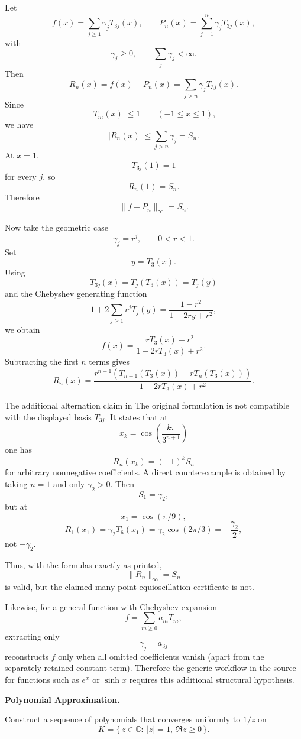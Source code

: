 \begin{solution}
Let
\[
f(x)=\sum_{j\ge1}\gamma_jT_{3j}(x),
\qquad
P_n(x)=\sum_{j=1}^{n}\gamma_jT_{3j}(x),
\]
with
\[
\gamma_j\ge0,
\qquad
\sum_j\gamma_j<\infty.
\]
Then
\[
R_n(x)
=
f(x)-P_n(x)
=
\sum_{j>n}\gamma_jT_{3j}(x).
\]
Since
\[
|T_m(x)|\le1
\qquad(-1\le x\le1),
\]
we have
\[
|R_n(x)|
\le
\sum_{j>n}\gamma_j
=
S_n.
\]
At \(x=1\),
\[
T_{3j}(1)=1
\]
for every \(j\), so
\[
R_n(1)=S_n.
\]
Therefore
\[
\boxed{
\|f-P_n\|_\infty=S_n.
}
\]

Now take the geometric case
\[
\gamma_j=r^j,
\qquad
0<r<1.
\]
Set
\[
y=T_3(x).
\]
Using
\[
T_{3j}(x)=T_j(T_3(x))=T_j(y)
\]
and the Chebyshev generating function
\[
1+2\sum_{j\ge1}r^jT_j(y)
=
\frac{1-r^2}{1-2ry+r^2},
\]
we obtain
\[
\boxed{
f(x)
=
\frac{rT_3(x)-r^2}
{1-2rT_3(x)+r^2}.
}
\]
Subtracting the first \(n\) terms gives
\[
\boxed{
R_n(x)
=
\frac{
r^{n+1}
\left(
T_{n+1}(T_3(x))
-
rT_n(T_3(x))
\right)
}{
1-2rT_3(x)+r^2
}.
}
\]

The additional alternation claim in The original formulation is not compatible with the displayed
basis \(T_{3j}\). It states that at
\[
x_k
=
\cos\left(\frac{k\pi}{3^{n+1}}\right)
\]
one has
\[
R_n(x_k)=(-1)^kS_n
\]
for arbitrary nonnegative coefficients. A direct counterexample is obtained by taking
\(n=1\) and only \(\gamma_2>0\). Then
\[
S_1=\gamma_2,
\]
but at
\[
x_1=\cos(\pi/9),
\]
\[
R_1(x_1)
=
\gamma_2T_6(x_1)
=
\gamma_2\cos(2\pi/3)
=
-\frac{\gamma_2}{2},
\]
not \(-\gamma_2\).

Thus, with the formulas exactly as printed,
\[
\boxed{
\|R_n\|_\infty=S_n
}
\]
is valid, but the claimed many-point equioscillation certificate is not.

Likewise, for a general function with Chebyshev expansion
\[
f=\sum_{m\ge0}a_mT_m,
\]
extracting only
\[
\gamma_j=a_{3j}
\]
reconstructs \(f\) only when all omitted coefficients vanish (apart from the separately
retained constant term). Therefore the generic workflow in the source for functions such as
\(e^x\) or \(\sinh x\) requires this additional structural hypothesis.
\end{solution}


\begin{problem}[CP-II-0496]
\label{prob:cp-ii-0496}
\textbf{Polynomial Approximation.}

	Construct a sequence of polynomials that converges uniformly to $1/z$ on
	\[
	K=\{\,z\in\mathbb C:\ |z|=1,\ \Re z\ge 0\,\}.
	\]
\end{problem}

